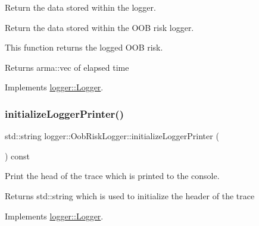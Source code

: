 Return the data stored within the logger. 

Return the data stored within the O\+OB risk logger.

This function returns the logged O\+OB risk.

\begin{DoxyReturn}{Returns}
{\ttfamily arma\+::vec} of elapsed time 
\end{DoxyReturn}


Implements \mbox{\hyperlink{classlogger_1_1_logger_aa4fc254c532172db3404b7c0bcd17092}{logger\+::\+Logger}}.

\mbox{\label{classlogger_1_1_oob_risk_logger_afb230d22eea9b1c025e6ff95685c692c}} 
\subsubsection{\texorpdfstring{initialize\+Logger\+Printer()}{initializeLoggerPrinter()}}
{\footnotesize\ttfamily std\+::string logger\+::\+Oob\+Risk\+Logger\+::initialize\+Logger\+Printer (\begin{DoxyParamCaption}{ }\end{DoxyParamCaption}) const\hspace{0.3cm}{\ttfamily [virtual]}}



Print the head of the trace which is printed to the console. 

\begin{DoxyReturn}{Returns}
{\ttfamily std\+::string} which is used to initialize the header of the trace 
\end{DoxyReturn}


Implements \mbox{\hyperlink{classlogger_1_1_logger_a825f96e8564ac4013ff09ef842c0aeec}{logger\+::\+Logger}}.

\mbox{\label{classlogger_1_1_oob_risk_logger_a948a89f02ac782c25a15c49c4a108c02}} 
